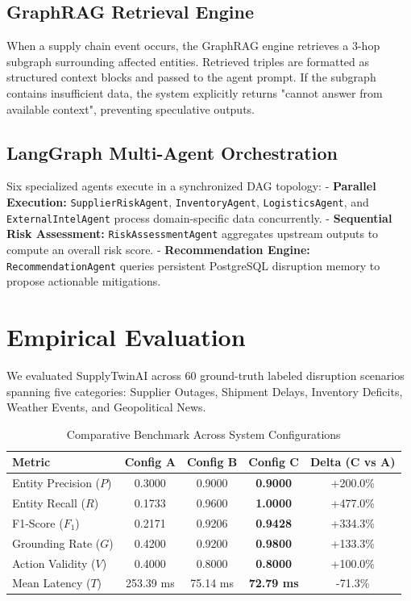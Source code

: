 \documentclass[journal]{IEEEtran}
\begin{document}
\subsection{GraphRAG Retrieval Engine}
When a supply chain event occurs, the GraphRAG engine retrieves a 3-hop subgraph surrounding affected entities. Retrieved triples are formatted as structured context blocks and passed to the agent prompt. If the subgraph contains insufficient data, the system explicitly returns "cannot answer from available context", preventing speculative outputs.

\subsection{LangGraph Multi-Agent Orchestration}
Six specialized agents execute in a synchronized DAG topology:
- \textbf{Parallel Execution:} \texttt{SupplierRiskAgent}, \texttt{InventoryAgent}, \texttt{LogisticsAgent}, and \texttt{ExternalIntelAgent} process domain-specific data concurrently.
- \textbf{Sequential Risk Assessment:} \texttt{RiskAssessmentAgent} aggregates upstream outputs to compute an overall risk score.
- \textbf{Recommendation Engine:} \texttt{RecommendationAgent} queries persistent PostgreSQL disruption memory to propose actionable mitigations.

\section{Empirical Evaluation}
We evaluated SupplyTwinAI across 60 ground-truth labeled disruption scenarios spanning five categories: Supplier Outages, Shipment Delays, Inventory Deficits, Weather Events, and Geopolitical News.

\begin{table}[htbp]
\caption{Comparative Benchmark Across System Configurations}
\label{tab:eval_results}
\centering
\begin{tabular}{lcccc}
\toprule
\textbf{Metric} & \textbf{Config A} & \textbf{Config B} & \textbf{Config C} & \textbf{Delta (C vs A)} \\
\midrule
Entity Precision ($P$) & 0.3000 & 0.9000 & \textbf{0.9000} & +200.0\% \\
Entity Recall ($R$)    & 0.1733 & 0.9600 & \textbf{1.0000} & +477.0\% \\
F1-Score ($F_1$)       & 0.2171 & 0.9206 & \textbf{0.9428} & +334.3\% \\
Grounding Rate ($G$)   & 0.4200 & 0.9200 & \textbf{0.9800} & +133.3\% \\
Action Validity ($V$)  & 0.4000 & 0.8000 & \textbf{0.8000} & +100.0\% \\
Mean Latency ($T$)     & 253.39 ms & 75.14 ms & \textbf{72.79 ms} & -71.3\% \\
\bottomrule
\end{tabular}
\end{table}
\end{document}

